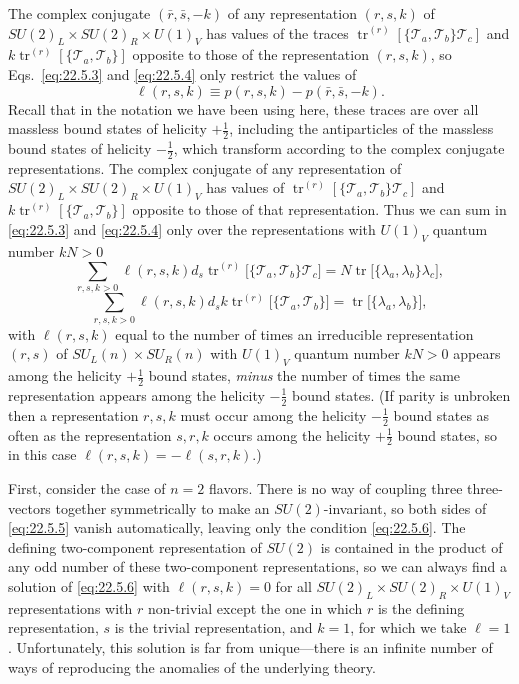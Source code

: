 The complex conjugate $(\bar r,\bar s,-k)$ of any representation $(r,s,k)$
of $SU(2)_L\times SU(2)_R\times U(1)_V$ has values of the traces
$\operatorname{tr}^{(r)}
[\{\mathcal T_a,\mathcal T_b\}\mathcal T_c]$ and
$k\operatorname{tr}^{(r)}[\{\mathcal T_a,\mathcal T_b\}]$ opposite to
those of the representation $(r,s,k)$, so Eqs.~\eqref{eq:22.5.3} and
\eqref{eq:22.5.4} only restrict the values of
\[
 \ell(r,s,k)\equiv p(r,s,k)-p(\bar r,\bar s,-k).
\]
Recall that in the notation we have been using here, these traces are over
all massless bound states of helicity $+\frac12$, including the
antiparticles of the massless bound states of helicity $-\frac12$, which
transform according to the complex conjugate representations. The complex
conjugate of any representation of
$SU(2)_L\times SU(2)_R\times U(1)_V$ has values of
$\operatorname{tr}^{(r)}
[\{\mathcal T_a,\mathcal T_b\}\mathcal T_c]$ and
$k\operatorname{tr}^{(r)}[\{\mathcal T_a,\mathcal T_b\}]$ opposite to
those of that representation. Thus we can sum in \eqref{eq:22.5.3} and
\eqref{eq:22.5.4} only over the representations with $U(1)_V$ quantum
number $kN>0$
\begin{equation}
 \sum_{r,s,k>0}\ell(r,s,k)d_s
 \operatorname{tr}^{(r)}
 \bigl[\{\mathcal T_a,\mathcal T_b\}\mathcal T_c\bigr]
 =
 N\operatorname{tr}\bigl[\{\lambda_a,\lambda_b\}\lambda_c\bigr],
 \tag{22.5.5}\label{eq:22.5.5}
\end{equation}
\begin{equation}
 \sum_{r,s,k>0}\ell(r,s,k)d_s k
 \operatorname{tr}^{(r)}
 \bigl[\{\mathcal T_a,\mathcal T_b\}\bigr]
 =
 \operatorname{tr}\bigl[\{\lambda_a,\lambda_b\}\bigr],
 \tag{22.5.6}\label{eq:22.5.6}
\end{equation}
with $\ell(r,s,k)$ equal to the number of times an irreducible
representation $(r,s)$ of $SU_L(n)\times SU_R(n)$ with $U(1)_V$ quantum
number $kN>0$ appears among the helicity $+\frac12$ bound states,
\emph{minus} the number of times the same representation appears among the
helicity $-\frac12$ bound states. (If parity is unbroken then a
representation $r,s,k$ must occur among the helicity $-\frac12$ bound
states as often as the representation $s,r,k$ occurs among the helicity
$+\frac12$ bound states, so in this case
$\ell(r,s,k)=-\ell(s,r,k)$.)

First, consider the case of $n=2$ flavors. There is no way of coupling
three three-vectors together symmetrically to make an $SU(2)$-invariant,
so both sides of \eqref{eq:22.5.5} vanish automatically, leaving only the
condition \eqref{eq:22.5.6}. The defining two-component representation of
$SU(2)$ is contained in the product of any odd number of these
two-component representations, so we can always find a solution of
\eqref{eq:22.5.6} with $\ell(r,s,k)=0$ for all
$SU(2)_L\times SU(2)_R\times U(1)_V$ representations with $r$ non-trivial
except the one in which $r$ is the defining representation, $s$ is the
trivial representation, and $k=1$, for which we take $\ell=1$.
Unfortunately, this solution is far from unique---there is an infinite
number of ways of reproducing the anomalies of the underlying theory.

